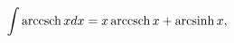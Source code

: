 \[\int\mathop{\mathrm{arccsch}\/}\nolimits xdx=x\mathop{\mathrm{arccsch}\/}%
\nolimits x+\mathop{\mathrm{arcsinh}\/}\nolimits x,\]